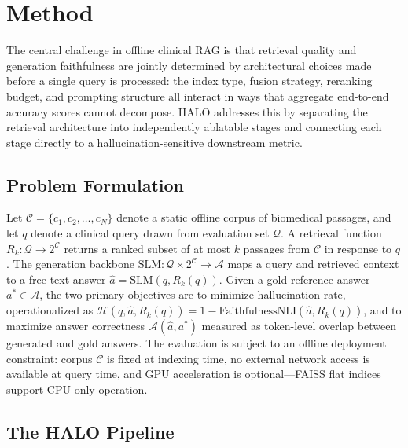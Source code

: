 \documentclass{article}
\begin{document}
\section{Method}

\label{sec:method}

The central challenge in offline clinical RAG is that retrieval quality and generation faithfulness are jointly determined by architectural choices made before a single query is processed: the index type, fusion strategy, reranking budget, and prompting structure all interact in ways that aggregate end-to-end accuracy scores cannot decompose. HALO addresses this by separating the retrieval architecture into independently ablatable stages and connecting each stage directly to a hallucination-sensitive downstream metric.

\subsection{Problem Formulation}

\label{sec:problem_formulation}

Let $\mathcal{C} = \{c_1, c_2, \ldots, c_N\}$ denote a static offline corpus of biomedical passages, and let $q$ denote a clinical query drawn from evaluation set $\mathcal{Q}$. A retrieval function $R_k : \mathcal{Q} \rightarrow 2^{\mathcal{C}}$ returns a ranked subset of at most $k$ passages from $\mathcal{C}$ in response to $q$. The generation backbone $\text{SLM} : \mathcal{Q} \times 2^{\mathcal{C}} \rightarrow \mathcal{A}$ maps a query and retrieved context to a free-text answer $\hat{a} = \text{SLM}(q, R_k(q))$. Given a gold reference answer $a^* \in \mathcal{A}$, the two primary objectives are to minimize hallucination rate, operationalized as $\mathcal{H}(q, \hat{a}, R_k(q)) = 1 - \text{FaithfulnessNLI}(\hat{a}, R_k(q))$, and to maximize answer correctness $\mathcal{A}(\hat{a}, a^*)$ measured as token-level overlap between generated and gold answers. The evaluation is subject to an offline deployment constraint: corpus $\mathcal{C}$ is fixed at indexing time, no external network access is available at query time, and GPU acceleration is optional---FAISS flat indices support CPU-only operation.

\subsection{The HALO Pipeline}

\label{sec:the_halo_pipeline}
\end{document}
